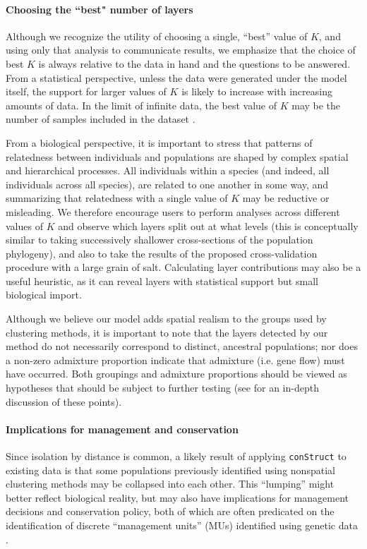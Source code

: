 \documentclass[10pt,letterpaper]{article}
\begin{document}
\paragraph{Choosing the ``best" number of layers}
Although we recognize the utility of choosing a single, ``best'' value of $K$, 
and using only that analysis to communicate results, 
we emphasize that 
the choice of best $K$ is always relative to the data in hand
and the questions to be answered.
From a statistical perspective, unless the data were generated under the model itself,
the support for larger values of $K$ is likely to increase with increasing amounts of data.
In the limit of infinite data, the best value of $K$ 
may be the number of samples included in the dataset \cite{Patterson2006}.

From a biological perspective, 
it is important to stress that patterns of relatedness between individuals and populations 
are shaped by complex spatial and hierarchical processes.
All individuals within a species (and indeed, all individuals across all species), 
are related to one another in some way, 
and summarizing that relatedness with a single value of $K$ may be reductive or misleading.
We therefore encourage users to perform analyses across different values of $K$ and 
observe which layers split out at what levels 
(this is conceptually similar to taking successively shallower
cross-sections of the population phylogeny), 
and also to take the results of the proposed cross-validation procedure with a large grain of salt.
Calculating layer contributions may also be a useful heuristic, 
as it can reveal layers with statistical support but small biological import.

Although we believe our model adds spatial realism to the groups used by clustering methods,
it is important to note that the layers detected by our method 
do not necessarily correspond  to distinct, ancestral populations; 
nor does a non-zero admixture proportion indicate that admixture 
(i.e. gene flow) must have occurred. 
Both groupings and admixture proportions
should be viewed as hypotheses that should be subject to further testing
(see \cite{Falush:16} for an in-depth discussion of these points).

\paragraph{Implications for management and conservation}
Since isolation by distance is common, 
a likely result of applying \texttt{conStruct} to existing data is that some
populations previously identified using nonspatial clustering methods 
may be collapsed into each other.  
This ``lumping'' might better reflect biological reality, 
but may also have implications for management decisions and conservation policy, 
both of which are often predicated on the identification of discrete ``management units'' (MUs) 
identified using genetic data \cite{Moritz1994,Waples_1998,Moritz_etal_2002}.
\end{document}
